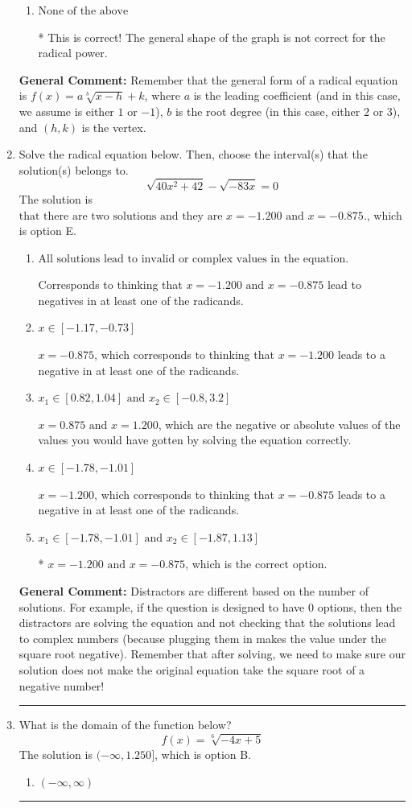 \documentclass{extbook}[14pt]
\newcommand{\litem}[1]{\item #1

\rule{\textwidth}{0.4pt}}
\begin{document}
\begin{enumerate}
{\begin{enumerate}[label=\Alph*.]
This corresponds to switching the coefficient AND switching the $x$-value of the vertex with the root degree as $3$.
\item \( \text{None of the above} \)

* This is correct! The general shape of the graph is not correct for the radical power.
\end{enumerate}

\textbf{General Comment:} Remember that the general form of a radical equation is $ f(x) = a \sqrt[b]{x - h} + k$, where $a$ is the leading coefficient (and in this case, we assume is either $1$ or $-1$), $b$ is the root degree (in this case, either $2$ or $3$), and $(h, k)$ is the vertex.
}
\litem{
Solve the radical equation below. Then, choose the interval(s) that the solution(s) belongs to.
\[ \sqrt{40 x^2 + 42} - \sqrt{-83 x} = 0 \]The solution is \( \text{that there are two solutions and they are } x = -1.200 \text{ and } x = -0.875. \), which is option E.\begin{enumerate}[label=\Alph*.]
\item \( \text{All solutions lead to invalid or complex values in the equation.} \)

Corresponds to thinking that $x = -1.200 \text{ and } x = -0.875$ lead to negatives in at least one of the radicands.
\item \( x \in [-1.17,-0.73] \)

$x = -0.875$, which corresponds to thinking that $x = -1.200$ leads to a negative in at least one of the radicands.
\item \( x_1 \in [0.82, 1.04] \text{ and } x_2 \in [-0.8,3.2] \)

$x = 0.875 \text{ and } x = 1.200$, which are the negative or absolute values of the values you would have gotten by solving the equation correctly.
\item \( x \in [-1.78,-1.01] \)

$x = -1.200$, which corresponds to thinking that $x = -0.875$ leads to a negative in at least one of the radicands.
\item \( x_1 \in [-1.78, -1.01] \text{ and } x_2 \in [-1.87,1.13] \)

* $x = -1.200 \text{ and } x = -0.875$, which is the correct option.
\end{enumerate}

\textbf{General Comment:} Distractors are different based on the number of solutions. For example, if the question is designed to have 0 options, then the distractors are solving the equation and not checking that the solutions lead to complex numbers (because plugging them in makes the value under the square root negative). Remember that after solving, we need to make sure our solution does not make the original equation take the square root of a negative number!
}
\litem{
What is the domain of the function below?
\[ f(x) = \sqrt[6]{-4 x + 5} \]The solution is \( (-\infty, 1.250] \), which is option B.\begin{enumerate}[label=\Alph*.]
\item \( (-\infty, \infty) \)


\end{enumerate}}
\end{enumerate}
\end{document}
